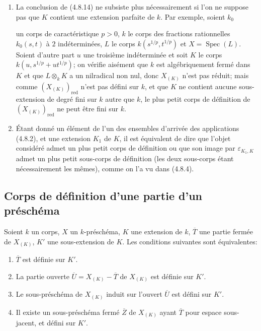\begin{remarks}[4.8.15]
\label{IV.2.4.8.15-fr}
\begin{enumerate}
\item[(i)] La conclusion de (4.8.14) ne subsiste plus nécessairement si l'on
ne suppose pas que $K$ contient une extension parfaite de $k$. Par exemple,
soient $k_0$


un corps de caractéristique $p>0$, $k$ le corps des fractions
rationnelles $k_0(s,t)$ à $2$ indéterminées, $L$ le corps
$k(s^{1/p},t^{1/p})$ et $X=\operatorname{Spec}(L)$. Soient d'autre part $u$
une troisième indéterminée et soit $K$ le corps
$k(u,s^{1/p}+ut^{1/p})$; on vérifie aisément que $k$ est algébriquement fermé
dans $K$ et que $L\otimes_kK$ a un nilradical non nul, donc $X_{(K)}$ n'est
pas réduit; mais comme $(X_{(K)})_{\mathrm{red}}$ n'est pas défini sur $k$,
et que $K$ ne contient aucune sous-extension de degré fini sur $k$ autre que
$k$, le plus petit corps de définition de $(X_{(K)})_{\mathrm{red}}$ ne peut
être fini sur $k$.

\item[(ii)] Étant donné un élément de l'un des ensembles d'arrivée des
applications (4.8.2), et une extension $K_1$ de $K$, il est équivalent de dire
que l'objet considéré admet un plus petit corps de définition ou que son image
par $\varepsilon_{K_1,K}$ admet un plus petit sous-corps de définition (les
deux sous-corps étant nécessairement les mêmes), comme on l'a vu dans
(4.8.4).
\end{enumerate}
\end{remarks}
\subsection{Corps de définition d'une partie d'un préschéma}

\begin{proposition}[4.9.1]
\label{IV.2.4.9.1-fr}
Soient $k$ un corps, $X$ un $k$-préschéma, $K$ une extension de $k$,
$\overline T$ une partie fermée de $X_{(K)}$, $K'$ une sous-extension de $K$.
Les conditions suivantes sont équivalentes:
\begin{enumerate}
\item[a)] $\overline T$ est définie sur $K'$.
\item[b)] La partie ouverte $\overline U=X_{(K)}-\overline T$ de $X_{(K)}$
est définie sur $K'$.
\item[b')] Le sous-préschéma de $X_{(K)}$ induit sur l'ouvert $\overline U$
est défini sur $K'$.
\item[c)] Il existe un sous-préschéma fermé $\overline Z$ de $X_{(K)}$ ayant
$\overline T$ pour espace sous-jacent, et défini sur $K'$.
\end{enumerate}
\end{proposition}

